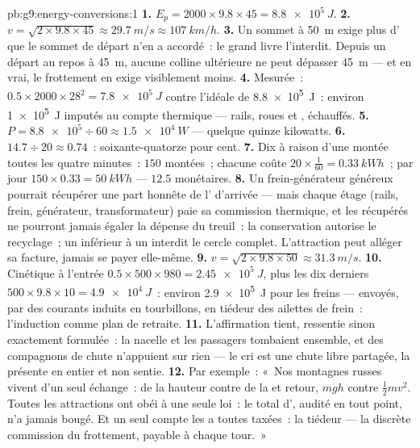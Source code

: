 \begin{solution}{pb:g9:energy-conversions:1}
\textbf{1.} $E_p = 2000 \times 9.8 \times 45 = \qty{8.8e5}{J}$.
\textbf{2.} $v = \sqrt{2 \times 9.8 \times 45} \approx
\qty{29.7}{m/s} \approx \qty{107}{km/h}$.
\textbf{3.} Un sommet à \qty{50}{m} exige plus d' que le
sommet de départ n'en a accordé~: le grand livre l'interdit. Depuis un
départ au repos à \qty{45}{m}, aucune colline ultérieure ne peut
dépasser \qty{45}{m} --- et en vrai, le frottement en exige
visiblement moins.
\textbf{4.} Mesurée~: $0.5 \times 2000 \times 28^2 = \qty{7.8e5}{J}$
contre l'idéale de \qty{8.8e5}{J}~: environ \qty{1e5}{J} imputés au
compte thermique --- rails, roues et , échauffés.
\textbf{5.} $P = \num{8.8e5} \div 60 \approx \qty{1.5e4}{W}$ ---
quelque quinze kilowatts.
\textbf{6.} $14.7 \div 20 \approx 0.74$~: soixante-quatorze pour
cent.
\textbf{7.} Dix  à raison d'une montée toutes les quatre
minutes~: $150$ montées~; chacune coûte
$20 \times \tfrac{1}{60} = \qty{0.33}{kWh}$~; par jour
$150 \times 0.33 = \qty{50}{kWh}$ --- $12.5$  monétaires.
\textbf{8.} Un frein-générateur généreux pourrait récupérer une part
honnête de l' d'arrivée --- mais chaque étage
(rails, frein, générateur, transformateur) paie sa commission
thermique, et les  récupérés ne pourront jamais égaler la
dépense du treuil~: la conservation autorise le recyclage~; un
 inférieur à un interdit le cercle complet. L'attraction peut
alléger sa facture, jamais se payer elle-même.
\textbf{9.} $v = \sqrt{2 \times 9.8 \times 50} \approx
\qty{31.3}{m/s}$.
\textbf{10.} Cinétique à l'entrée
$0.5 \times 500 \times 980 = \qty{2.45e5}{J}$, plus les dix derniers
 $500 \times 9.8 \times 10 = \qty{4.9e4}{J}$~: environ
\qty{2.9e5}{J} pour les freins --- envoyés, par des courants induits
en tourbillons, en tiédeur des ailettes de frein~: l'induction comme
plan de retraite.
\textbf{11.} L'affirmation tient, ressentie sinon exactement
formulée~: la nacelle et les passagers tombaient ensemble, et des
compagnons de chute n'appuient sur rien --- le cri est une chute libre
partagée, la  présente en entier et non sentie.
\textbf{12.} Par exemple~: «~Nos montagnes russes vivent d'un seul
échange~: de la hauteur contre de la  et retour, $m g h$ contre
$\frac12 m v^2$. Toutes les attractions ont obéi à une seule loi~: le
total d', audité en tout point, n'a jamais bougé. Et un seul
compte les a toutes taxées~: la tiédeur --- la discrète commission du
frottement, payable à chaque tour.~»
\end{solution}
